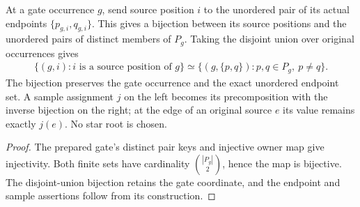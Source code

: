 \begin{definition}
    \label{def:peps_original_source_pair_edges}
    \leanok
    At a gate occurrence $g$, send source position $i$ to the unordered pair of
    its actual endpoints $\{p_{g,i},q_{g,i}\}$. This gives a bijection between
    its source positions and the unordered pairs of distinct members of $P_g$.
    Taking the disjoint union over original occurrences gives
    \begin{align}
        \{(g,i):i\text{ is a source position of }g\}
        \simeq\{(g,\{p,q\}):p,q\in P_g,\ p\ne q\}.
        \label{eq:peps_original_source_pairs}
    \end{align}
    The bijection preserves the gate occurrence and the exact unordered endpoint
    set. A sample assignment $j$ on the left becomes its precomposition with the
    inverse bijection on the right; at the edge of an original source $e$ its
    value remains exactly $j(e)$. No star root is chosen.
\end{definition}

\begin{proof}
    \leanok
    The prepared gate's distinct pair keys and injective owner map give
    injectivity. Both finite sets have cardinality $\binom{|P_g|}{2}$, hence the
    map is bijective. The disjoint-union bijection retains the gate coordinate,
    and the endpoint and sample assertions follow from its construction.
\end{proof}

